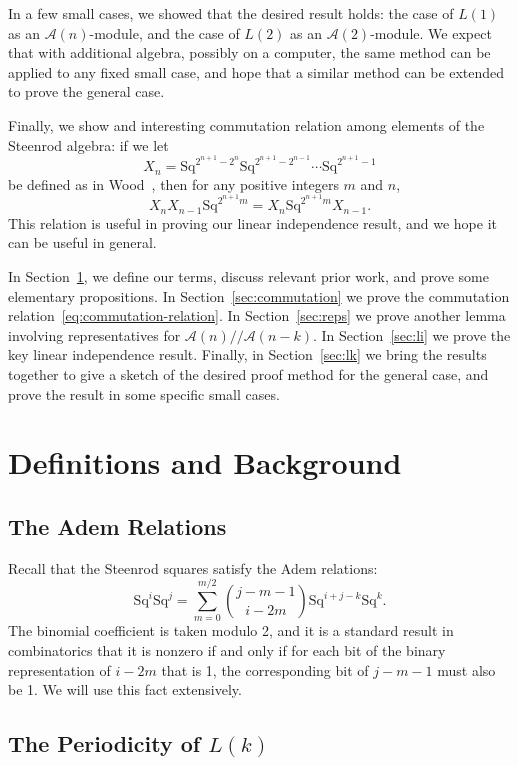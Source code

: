 \documentclass{article}
\newcommand{\A}{\mathcal{A}}
\newcommand{\Sq}{\mathrm{Sq}}
\newcommand{\mmod}{/\!/\!}
\begin{document}
In a few small cases, we showed that the desired result holds: the case of $L(1)$ as an $\A(n)$-module, and the case of $L(2)$ as an $\A(2)$-module.  We expect that with additional algebra, possibly on a computer, the same method can be applied to any fixed small case, and hope that a similar method can be extended to prove the general case.

Finally, we show and interesting commutation relation among elements of the Steenrod algebra: if we let
\[ X_n = \Sq^{2^{n+1}-2^n}\Sq^{2^{n+1}-2^{n-1}}\cdots\Sq^{2^{n+1}-1} \]
be defined as in Wood~\cite{wood}, then for any positive integers $m$ and $n$, 
\begin{equation}X_nX_{n-1}\Sq^{2^{n+1}m} = X_n\Sq^{2^{n+1}m}X_{n-1}.\label{eq:commutation-relation}\end{equation}
This relation is useful in proving our linear independence result, and we hope it can be useful in general.

In Section~\ref{sec:defns}, we define our terms, discuss relevant prior work, and prove some elementary propositions.  In Section~\ref{sec:commutation} we prove the commutation relation~\ref{eq:commutation-relation}.  In Section~\ref{sec:reps} we prove another lemma involving representatives for $\A(n)\mmod\A(n-k)$.  In Section~\ref{sec:li} we prove the key linear independence result.  Finally, in Section~\ref{sec:lk} we bring the results together to give a sketch of the desired proof method for the general case, and prove the result in some specific small cases.

\section{Definitions and Background}\label{sec:defns}

\subsection{The Adem Relations}

Recall that the Steenrod squares satisfy the Adem relations:
\[ \Sq^i\Sq^j = \sum_{m=0}^{m/2}\binom{j-m-1}{i-2m}\Sq^{i+j-k}\Sq^k.\]
The binomial coefficient is taken modulo 2, and it is a standard result in combinatorics that it is nonzero if and only if for each bit of the binary representation of $i-2m$ that is 1, the corresponding bit of $j-m-1$ must also be 1.  We will use this fact extensively.

\subsection{The Periodicity of \boldmath$L(k)$}
\end{document}
